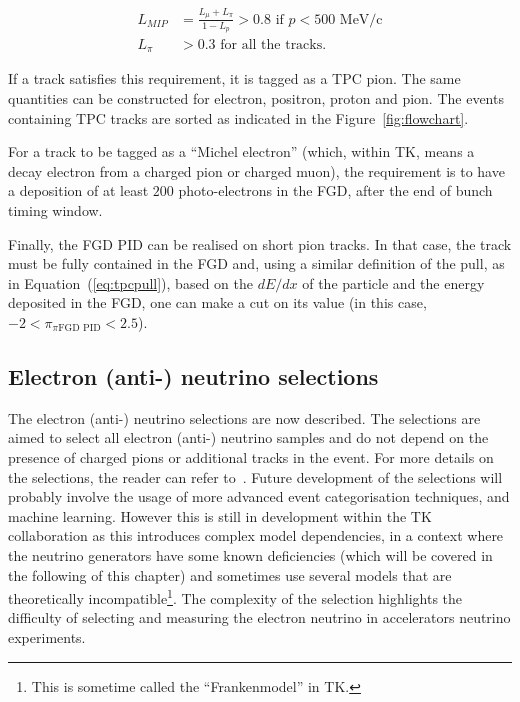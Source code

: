 \begin{align*}
  L_{MIP} &= \frac{L_{\mu}+L_{\pi}}{1-L_p} > 0.8 \text{~if~} p < 500 \text{~MeV/c}\\
  L_{\pi} &> 0.3 \text{~for all the tracks.} 
\end{align*}

If a track satisfies this requirement, it is tagged as a \Gls{TPC}
pion. The same quantities can be constructed for electron, positron,
proton and pion. The events containing \Gls{TPC} tracks are sorted as
indicated in the Figure~\ref{fig:flowchart}.

For a track to be tagged as a ``Michel electron'' (which, within
\Gls{TK}, means a decay electron from a charged pion or charged muon),
the requirement is to have a deposition of at least $200$
photo-electrons in the \Gls{FGD}, after the end of bunch timing
window.

Finally, the \Gls{FGD} \Gls{PID} can be realised on short pion tracks.
In that case, the track must be fully contained in the \Gls{FGD} and,
using a similar definition of the pull, as in
Equation~(\ref{eq:tpcpull}), based on the $dE/dx$ of the particle and
the energy deposited in the \Gls{FGD}, one can make a cut on its value
(in this case, $-2<\pi_{\pi \text{FGD PID}} < 2.5$).

\subsection{Electron (anti-) neutrino selections}
\label{subsec:electronneutrinoselections}
The electron (anti-) neutrino selections are now described. The
selections are aimed to select all electron (anti-) neutrino samples
and do not depend on the presence of charged pions or additional
tracks in the event. For more details on the selections, the reader
can refer to~\cite{TN282}. Future development of the selections will
probably involve the usage of more advanced event categorisation
techniques, and machine learning.  However this is still in
development within the \Gls{TK} collaboration as this introduces
complex model dependencies, in a context where the neutrino generators
have some known deficiencies (which will be covered in the following
of this chapter) and sometimes use several models that are
theoretically incompatible\footnote{This is sometime called the
  ``Frankenmodel'' in \Gls{TK}.}. The complexity of the selection
highlights the difficulty of selecting and measuring the electron
neutrino in accelerators neutrino experiments.

